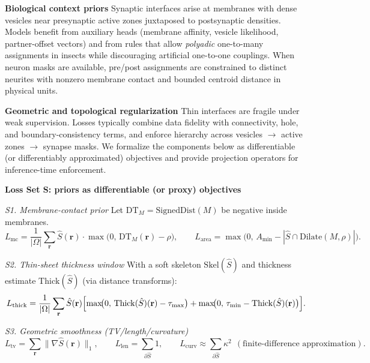 \medskip
\noindent\textbf{Biological context priors}\;
Synaptic interfaces arise at membranes with dense vesicles near presynaptic active zones juxtaposed to postsynaptic densities.
Models benefit from auxiliary heads (membrane affinity, vesicle likelihood, partner-offset vectors) and from rules that allow \emph{polyadic} one-to-many assignments in insects while discouraging artificial one-to-one couplings.
When neuron masks are available, pre/post assignments are constrained to distinct neurites with nonzero membrane contact and bounded centroid distance in physical units.\par

\medskip
\noindent\textbf{Geometric and topological regularization}\;
Thin interfaces are fragile under weak supervision.
Losses typically combine data fidelity with connectivity, hole, and boundary-consistency terms, and enforce hierarchy across vesicles \(\rightarrow\) active zones \(\rightarrow\) synapse masks.
We formalize the components below as differentiable (or differentiably approximated) objectives and provide projection operators for inference-time enforcement.\par

\medskip
\noindent\textbf{Loss Set S: priors as differentiable (or proxy) objectives}\;

\noindent\textit{S1. Membrane-contact prior}\;
Let \(\mathrm{DT}_M=\mathrm{SignedDist}(M)\) be negative inside membranes.
\[
L_{\mathrm{mc}}
=\frac{1}{|\Omega|}\sum_{\mathbf r}\hat S(\mathbf r)\cdot \max\!\bigl(0,\,\mathrm{DT}_M(\mathbf r)-\rho\bigr),
\qquad
L_{\mathrm{area}}
=\max\!\bigl(0,\,A_{\min}-|\hat S\cap \mathrm{Dilate}(M,\rho)|\bigr).
\]

\noindent\textit{S2. Thin-sheet thickness window}\;
With a soft skeleton \(\mathrm{Skel}(\hat S)\) and thickness estimate \(\mathrm{Thick}(\hat S)\) (via distance transforms):
\[
L_{\mathrm{thick}}
=\frac{1}{|\Omega|}\sum_{\mathbf r}\hat S(\mathbf r)\Bigl[
\max\!\bigl(0,\,\mathrm{Thick}(\hat S)(\mathbf r)-\tau_{\max}\bigr)
+\max\!\bigl(0,\,\tau_{\min}-\mathrm{Thick}(\hat S)(\mathbf r)\bigr)\Bigr].
\]

\noindent\textit{S3. Geometric smoothness (TV/length/curvature)}\;
\[
L_{\mathrm{tv}}=\sum_{\mathbf r}\lVert\nabla \hat S(\mathbf r)\rVert_1,
\qquad
L_{\mathrm{len}}=\sum_{\partial \hat S}1,
\qquad
L_{\mathrm{curv}}\approx \sum_{\partial \hat S}\kappa^2
\ \ (\text{finite-difference approximation}).
\]

